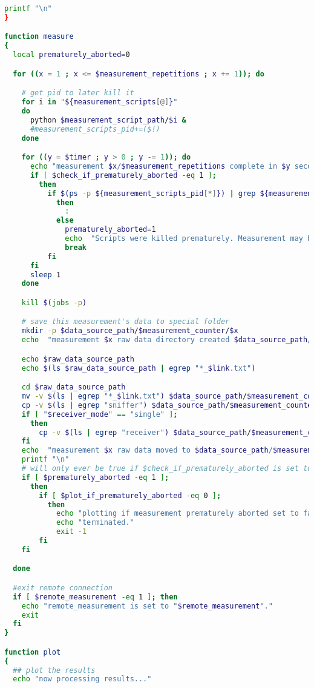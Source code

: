 \begin{lstlisting}[language=Bash,caption=measure.sh]
    printf "\n"
}

function measure
{
  local prematurely_aborted=0

  for ((x = 1 ; x <= $measurement_repetitions ; x += 1)); do

    # get pid to later kill it
    for i in "${measurement_scripts[@]}"
    do
      python $measurement_script_path/$i &
      #measurement_scripts_pid+=($!)
    done

    for ((y = $timer ; y > 0 ; y -= 1)); do
      echo "measurement $x/$measurement_repetitions complete in $y second(s)."
      if [ $check_if_prematurely_aborted -eq 1 ];
        then
          if $(ps -p ${measurement_scripts_pid[*]}) | grep ${measurement_scripts_pid[*]};
            then
              :
            else
              prematurely_aborted=1
              echo  "Scripts were killed prematurely. Measurement may be incomplete."
              break
          fi
      fi
      sleep 1
    done

    kill $(jobs -p)

    # save this measurement's data to special folder
    mkdir -p $data_source_path/$measurement_counter/$x
    echo  "measurement $x raw data directory created $data_source_path/$measurement_counter/$x/."

    echo $raw_data_source_path
    echo $(ls $raw_data_source_path | egrep "*_$link.txt")

    cd $raw_data_source_path
    mv -v $(ls | egrep "*_$link.txt") $data_source_path/$measurement_counter/$x/
    cp -v $(ls | egrep "sniffer") $data_source_path/$measurement_counter/$x/
    if [ "$receiver_mode" == "single" ];
      then
        cp -v $(ls | egrep "receiver") $data_source_path/$measurement_counter/$x/
    fi
    echo  "measurement $x raw data moved to $data_source_path/$measurement_counter/$x/."
    printf "\n"
    # will only ever be true if $check_if_prematurely_aborted is set to 1
    if [ $prematurely_aborted -eq 1 ];
      then
        if [ $plot_if_prematurely_aborted -eq 0 ];
          then
            echo "plotting if measurement prematurely aborted set to false."
            echo "terminated."
            exit -1
        fi
    fi

  done

  #exit remote connection
  if [ $remote_measurement -eq 1 ]; then
    echo "remote_measurement is set to "$remote_measurement"."
    exit
  fi
}

function plot
{
  ## plot the results
  echo "now processing results..."


\end{lstlisting}
